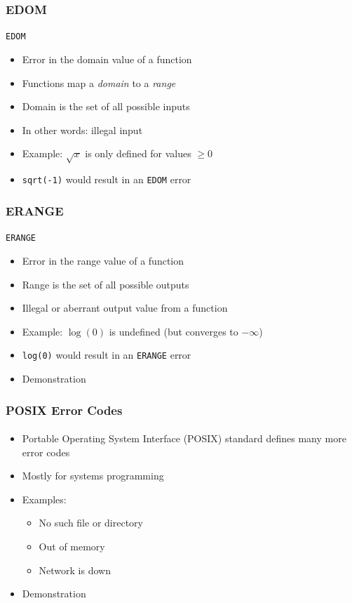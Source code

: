 \documentclass[]{beamer}
\begin{document}
\begin{frame}
    \frametitle{EDOM}
    \framesubtitle{}

\texttt{EDOM}
\begin{itemize}[<+->]
  \item Error in the domain value of a function
  \item Functions map a \emph{domain} to a \emph{range}
  \item Domain is the set of all possible inputs
  \item In other words: illegal input
  \item Example: $\sqrt{x}$ is only defined for values $\geq 0$
  \item \texttt{sqrt(-1)} would result in an \texttt{EDOM} error
\end{itemize}
    
\end{frame}

\begin{frame}
    \frametitle{ERANGE}
    \framesubtitle{}

\texttt{ERANGE}
\begin{itemize}[<+->]
  \item Error in the range value of a function
  \item Range is the set of all possible outputs
  \item Illegal or aberrant output value from a function
  \item Example: $\log{(0)}$ is undefined (but converges to $-\infty$)
  \item \texttt{log(0)} would result in an \texttt{ERANGE} error
  \item Demonstration
\end{itemize}
    
\end{frame}


\begin{frame}
    \frametitle{POSIX Error Codes}
    \framesubtitle{}

\begin{itemize}[<+->]
  \item Portable Operating System Interface (POSIX) standard defines many more error codes
  \item Mostly for systems programming 
  \item Examples:
  \begin{itemize}
    \item No such file or directory
    \item Out of memory
    \item Network is down
  \end{itemize}
  \item Demonstration %
\end{itemize}

\end{frame}
\end{document}
